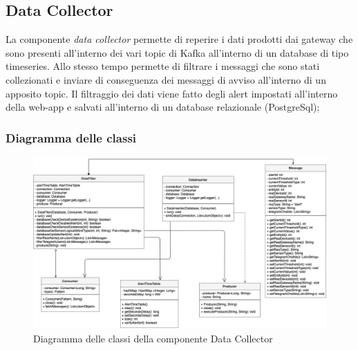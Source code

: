 \subsection{Data Collector}
La componente \textit{data collector} permette di reperire i dati prodotti dai gateway che sono presenti all'interno dei vari topic di Kafka all'interno di un database di tipo timeseries. Allo stesso tempo permette di filtrare i messaggi che sono stati collezionati e inviare di conseguenza dei messaggi di avviso all'interno di un apposito topic.
Il filtraggio dei dati viene fatto degli alert impostati all'interno della web-app e salvati all'interno di un database relazionale (PostgreSql);
\begin{landscape}
	\subsubsection{Diagramma delle classi}
		\begin{figure}[H]
			\centering
			\includegraphics[scale=0.500]{res/images/DATACOLLECTOR/ClassikafkaDataCollector.png}
			\caption{Diagramma delle classi della componente Data Collector}
		\end{figure}
\end{landscape}